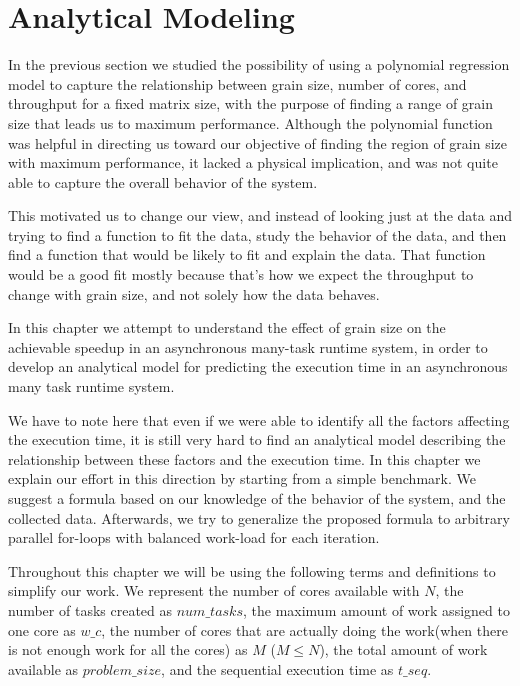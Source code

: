\section{Analytical Modeling}
In the previous section we studied the possibility of using a polynomial regression model to capture the relationship between grain size, number of cores, and throughput for a fixed matrix size, with the purpose of finding a range of grain size that leads us to maximum performance. 
Although the polynomial function was helpful in directing us toward our objective of finding the region of grain size with maximum performance, it lacked a physical implication, and was not quite able to capture the overall behavior of the system. 

This motivated us to change our view, and instead of looking just at the data and trying to find a function to fit the data, study the behavior of the data, and then find a function that would be likely to fit and explain the data. That function would be a good fit mostly because that's how we expect the throughput to change with grain size, and not solely how the data behaves.   

In this chapter we attempt to understand the effect of grain size on the achievable speedup in an asynchronous many-task runtime system, in order to develop an analytical model for predicting the execution time in an asynchronous many task runtime system. 

We have to note here that even if we were able to identify all the factors affecting the execution time, it is still very hard to find an analytical model describing the relationship between these factors and the execution time. In this chapter we explain our effort in this direction by starting from a simple benchmark. We suggest a formula based on our knowledge of the behavior of the system, and the collected data. Afterwards, we  try to generalize the proposed formula to arbitrary parallel for-loops with balanced work-load for each iteration. 


Throughout this chapter we will be using the following terms and definitions to simplify our work. We represent the number of cores available with $N$, the number of tasks created as $num\_{tasks}$, the maximum amount of work assigned to one core as $w\_c$, the number of cores that are actually doing the work(when there is not enough work for all the cores) as $M$ ($M\leq{N}$), the total amount of work available as $problem\_{size}$, and the sequential execution time as $t\_{seq}$.

